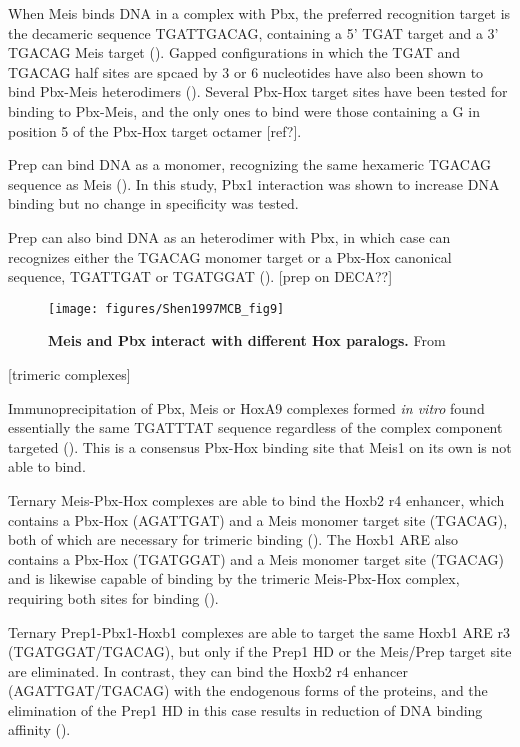 When Meis binds DNA in a complex with Pbx, the preferred recognition target is the decameric sequence TGATTGACAG, containing a 5' TGAT target and a 3' TGACAG Meis target (\cite{Chang1997}). Gapped configurations in which the TGAT and TGACAG half sites are spcaed by 3 or 6 nucleotides have also been shown to bind Pbx-Meis heterodimers (\cite{Jacobs1999}). Several Pbx-Hox target sites have been tested for binding to Pbx-Meis, and the only ones to bind were those containing a G in position 5 of the Pbx-Hox target octamer [ref?]. 

Prep can bind DNA as a monomer, recognizing the same hexameric TGACAG sequence as Meis (\cite{Berthelsen1998a}). In this study, Pbx1 interaction was shown to increase DNA binding but no change in specificity was tested.

Prep can also bind DNA as an heterodimer with Pbx, in which case can recognizes either the TGACAG monomer target or a Pbx-Hox canonical sequence, TGATTGAT or TGATGGAT (\cite{Berthelsen1998}). [prep on DECA??]


\begin{figure}[]
  
  \centering
  \texttt{[image: figures/Shen1997MCB\_fig9]}
  \caption[Meis and Pbx interact with different Hox paralogs]{\textbf{Meis and Pbx interact with different Hox paralogs.} From \cite{Shen1997}}
  \label{fig:Shen1997MCB_fig9}
\end{figure}

[trimeric complexes]

Immunoprecipitation of Pbx, Meis or HoxA9 complexes formed \textit{in vitro} found essentially the same TGATTTAT sequence regardless of the complex component targeted (\cite{Shen1999}). This is a consensus Pbx-Hox binding site that Meis1 on its own is not able to bind.

Ternary Meis-Pbx-Hox complexes are able to bind the Hoxb2 r4 enhancer, which contains a Pbx-Hox (AGATTGAT) and a Meis monomer target site (TGACAG), both of which are necessary for trimeric binding (\cite{Jacobs1999}). The Hoxb1 \ac{ARE} also contains a Pbx-Hox (TGATGGAT) and a Meis monomer target site (TGACAG) and is likewise capable of binding by the trimeric Meis-Pbx-Hox complex, requiring both sites for binding (\cite{Jacobs1999}).

Ternary Prep1-Pbx1-Hoxb1 complexes are able to target the same Hoxb1 \ac{ARE} r3 (TGATGGAT/TGACAG), but only if the Prep1 \ac{HD} or the Meis/Prep target site are eliminated. In contrast, they can bind the Hoxb2 r4 enhancer (AGATTGAT/TGACAG) with the endogenous forms of the proteins, and the elimination of the Prep1 \ac{HD} in this case results in reduction of DNA binding affinity (\cite{Ferretti2000}).

